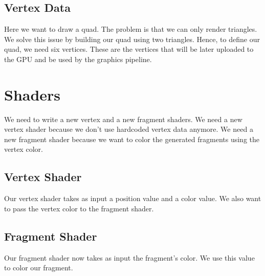 \subsection{Vertex Data}

Here we want to draw a quad.
The problem is that we can only render triangles.
We solve this issue by building our quad using two triangles.
Hence, to define our quad, we need six vertices.
These are the vertices that will be later uploaded to the GPU and be used
by the graphics pipeline.

\begin{minipage}{\linewidth}{\noindent}
    
\end{minipage}

\section{Shaders}

We need to write a new vertex and a new fragment shaders.
We need a new vertex shader because we don't use hardcoded vertex data anymore.
We need a new fragment shader because we want to color the generated fragments
using the vertex color.

\subsection{Vertex Shader}

Our vertex shader takes as input a position value and a color value.
We also want to pass the vertex color to the fragment shader.

\begin{minipage}{\linewidth}{\noindent}
    
\end{minipage}

\subsection{Fragment Shader}

Our fragment shader now takes as input the fragment's color.
We use this value to color our fragment.

\begin{minipage}{\linewidth}{\noindent}
    
\end{minipage}


